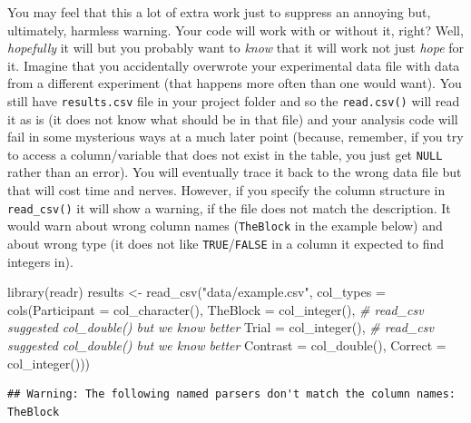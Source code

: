 \documentclass[
]{book}
\newenvironment{Shaded}{\begin{snugshade}}{\end{snugshade}}
\newcommand{\AttributeTok}[1]{\textcolor[rgb]{0.77,0.63,0.00}{#1}}
\newcommand{\CommentTok}[1]{\textcolor[rgb]{0.56,0.35,0.01}{\textit{#1}}}
\newcommand{\FunctionTok}[1]{\textcolor[rgb]{0.00,0.00,0.00}{#1}}
\newcommand{\NormalTok}[1]{#1}
\newcommand{\OtherTok}[1]{\textcolor[rgb]{0.56,0.35,0.01}{#1}}
\newcommand{\StringTok}[1]{\textcolor[rgb]{0.31,0.60,0.02}{#1}}
\begin{document}
You may feel that this a lot of extra work just to suppress an annoying but, ultimately, harmless warning. Your code will work with or without it, right? Well, \emph{hopefully} it will but you probably want to \emph{know} that it will work not just \emph{hope} for it. Imagine that you accidentally overwrote your experimental data file with data from a different experiment (that happens more often than one would want). You still have \texttt{results.csv} file in your project folder and so the \texttt{read.csv()} will read it as is (it does not know what should be in that file) and your analysis code will fail in some mysterious ways at a much later point (because, remember, if you try to access a column/variable that does not exist in the table, you just get \texttt{NULL} rather than an error). You will eventually trace it back to the wrong data file but that will cost time and nerves. However, if you specify the column structure in \texttt{read\_csv()} it will show a warning, if the file does not match the description. It would warn about wrong column names (\texttt{TheBlock} in the example below) and about wrong type (it does not like \texttt{TRUE}/\texttt{FALSE} in a column it expected to find integers in).

\begin{Shaded}
\begin{Highlighting}[]
\FunctionTok{library}\NormalTok{(readr)}
\NormalTok{results }\OtherTok{\textless{}{-}} \FunctionTok{read\_csv}\NormalTok{(}\StringTok{"data/example.csv"}\NormalTok{, }
                    \AttributeTok{col\_types =} \FunctionTok{cols}\NormalTok{(}\AttributeTok{Participant =} \FunctionTok{col\_character}\NormalTok{(),}
                                     \AttributeTok{TheBlock =} \FunctionTok{col\_integer}\NormalTok{(), }\CommentTok{\# read\_csv suggested col\_double() but we know better}
                                     \AttributeTok{Trial =} \FunctionTok{col\_integer}\NormalTok{(), }\CommentTok{\# read\_csv suggested col\_double() but we know better}
                                     \AttributeTok{Contrast =} \FunctionTok{col\_double}\NormalTok{(),}
                                     \AttributeTok{Correct =} \FunctionTok{col\_integer}\NormalTok{()))}
\end{Highlighting}
\end{Shaded}

\begin{verbatim}
## Warning: The following named parsers don't match the column names: TheBlock
\end{verbatim}
\end{document}
